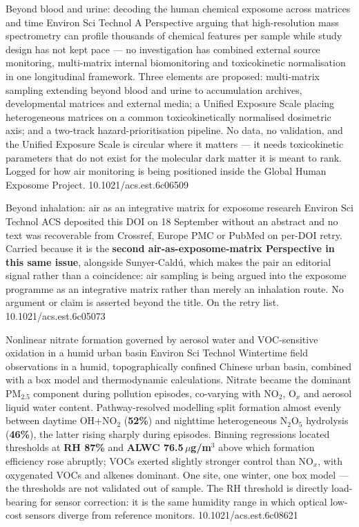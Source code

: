 \documentclass[10pt]{article}
\begin{document}
{Beyond blood and urine: decoding the human chemical exposome across matrices and time}
{Environ Sci Technol}
{A Perspective arguing that high-resolution mass spectrometry can profile thousands of
chemical features per sample while study design has not kept pace --- no investigation has
combined external source monitoring, multi-matrix internal biomonitoring and toxicokinetic
normalisation in one longitudinal framework. Three elements are proposed: multi-matrix
sampling extending beyond blood and urine to accumulation archives, developmental matrices
and external media; a Unified Exposure Scale placing heterogeneous matrices on a common
toxicokinetically normalised dosimetric axis; and a two-track hazard-prioritisation
pipeline. No data, no validation, and the Unified Exposure Scale is circular where it
matters --- it needs toxicokinetic parameters that do not exist for the molecular dark
matter it is meant to rank. Logged for how air monitoring is being positioned inside the
Global Human Exposome Project.}
{10.1021/acs.est.6c06509}

{Beyond inhalation: air as an integrative matrix for exposome research}
{Environ Sci Technol}
{ACS deposited this DOI on 18 September without an abstract and no text was recoverable
from Crossref, Europe PMC or PubMed on per-DOI retry. Carried because it is the
\textbf{second air-as-exposome-matrix Perspective in this same issue}, alongside
Sunyer-Cald\'u, which makes the pair an editorial signal rather than a coincidence: air
sampling is being argued into the exposome programme as an integrative matrix rather than
merely an inhalation route. No argument or claim is asserted beyond the title.
On the retry list.}
{10.1021/acs.est.6c05073}

{Nonlinear nitrate formation governed by aerosol water and VOC-sensitive oxidation in a
humid urban basin}
{Environ Sci Technol}
{Wintertime field observations in a humid, topographically confined Chinese urban basin,
combined with a box model and thermodynamic calculations. Nitrate became the dominant
PM$_{2.5}$ component during pollution episodes, co-varying with NO$_2$, O$_x$ and aerosol
liquid water content. Pathway-resolved modelling split formation almost evenly between
daytime OH+NO$_2$ (\textbf{52\%}) and nighttime heterogeneous N$_2$O$_5$ hydrolysis
(\textbf{46\%}), the latter rising sharply during episodes. Binning regressions located
thresholds at \textbf{RH 87\%} and \textbf{ALWC 76.5\,$\mu$g/m$^3$} above which formation
efficiency rose abruptly; VOCs exerted slightly stronger control than NO$_x$, with
oxygenated VOCs and alkenes dominant. One site, one winter, one box model --- the
thresholds are not validated out of sample. The RH threshold is directly load-bearing for
sensor correction: it is the same humidity range in which optical low-cost sensors diverge
from reference monitors.}
{10.1021/acs.est.6c08621}
\end{document}
